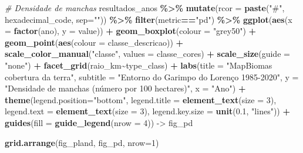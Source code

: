 \documentclass[
]{article}
\newenvironment{Shaded}{\begin{snugshade}}{\end{snugshade}}
\newcommand{\AttributeTok}[1]{\textcolor[rgb]{0.13,0.29,0.53}{#1}}
\newcommand{\CommentTok}[1]{\textcolor[rgb]{0.56,0.35,0.01}{\textit{#1}}}
\newcommand{\DecValTok}[1]{\textcolor[rgb]{0.00,0.00,0.81}{#1}}
\newcommand{\FloatTok}[1]{\textcolor[rgb]{0.00,0.00,0.81}{#1}}
\newcommand{\FunctionTok}[1]{\textcolor[rgb]{0.13,0.29,0.53}{\textbf{#1}}}
\newcommand{\NormalTok}[1]{#1}
\newcommand{\OtherTok}[1]{\textcolor[rgb]{0.56,0.35,0.01}{#1}}
\newcommand{\SpecialCharTok}[1]{\textcolor[rgb]{0.81,0.36,0.00}{\textbf{#1}}}
\newcommand{\StringTok}[1]{\textcolor[rgb]{0.31,0.60,0.02}{#1}}
\begin{document}
\begin{Shaded}
\begin{Highlighting}[]
\CommentTok{\# Densidade de manchas}
\NormalTok{resultados\_anos }\SpecialCharTok{\%\textgreater{}\%} 
  \FunctionTok{mutate}\NormalTok{(}\AttributeTok{rcor =} \FunctionTok{paste}\NormalTok{(}\StringTok{"\#"}\NormalTok{, hexadecimal\_code, }\AttributeTok{sep=}\StringTok{""}\NormalTok{)) }\SpecialCharTok{\%\textgreater{}\%} 
  \FunctionTok{filter}\NormalTok{(metric}\SpecialCharTok{==}\StringTok{"pd"}\NormalTok{) }\SpecialCharTok{\%\textgreater{}\%}
\FunctionTok{ggplot}\NormalTok{(}\FunctionTok{aes}\NormalTok{(}\AttributeTok{x =} \FunctionTok{factor}\NormalTok{(ano), }\AttributeTok{y =}\NormalTok{ value)) }\SpecialCharTok{+} 
\FunctionTok{geom\_boxplot}\NormalTok{(}\AttributeTok{colour =} \StringTok{"grey50"}\NormalTok{) }\SpecialCharTok{+} 
\FunctionTok{geom\_point}\NormalTok{(}\FunctionTok{aes}\NormalTok{(}\AttributeTok{colour =}\NormalTok{ classe\_descricao)) }\SpecialCharTok{+} 
\FunctionTok{scale\_color\_manual}\NormalTok{(}\StringTok{"classe"}\NormalTok{, }\AttributeTok{values =}\NormalTok{ classe\_cores) }\SpecialCharTok{+}
\FunctionTok{scale\_size}\NormalTok{(}\AttributeTok{guide =} \StringTok{"none"}\NormalTok{) }\SpecialCharTok{+} 
\FunctionTok{facet\_grid}\NormalTok{(raio\_km}\SpecialCharTok{\textasciitilde{}}\NormalTok{type\_class) }\SpecialCharTok{+}
\FunctionTok{labs}\NormalTok{(}\AttributeTok{title =} \StringTok{"MapBiomas cobertura da terra"}\NormalTok{, }
\AttributeTok{subtitle =} \StringTok{"Entorno do Garimpo do Lorenço 1985{-}2020"}\NormalTok{,}
\AttributeTok{y =} \StringTok{"Densidade de manchas (número por 100 hectares)"}\NormalTok{, }
\AttributeTok{x =} \StringTok{"Ano"}\NormalTok{) }\SpecialCharTok{+} 
\FunctionTok{theme}\NormalTok{(}\AttributeTok{legend.position=}\StringTok{"bottom"}\NormalTok{, }
      \AttributeTok{legend.title =} \FunctionTok{element\_text}\NormalTok{(}\AttributeTok{size =} \DecValTok{3}\NormalTok{), }
              \AttributeTok{legend.text  =} \FunctionTok{element\_text}\NormalTok{(}\AttributeTok{size =} \DecValTok{3}\NormalTok{),}
              \AttributeTok{legend.key.size =} \FunctionTok{unit}\NormalTok{(}\FloatTok{0.1}\NormalTok{, }\StringTok{"lines"}\NormalTok{)) }\SpecialCharTok{+} 
\FunctionTok{guides}\NormalTok{(}\AttributeTok{fill =} \FunctionTok{guide\_legend}\NormalTok{(}\AttributeTok{nrow =} \DecValTok{4}\NormalTok{)) }\OtherTok{{-}\textgreater{}}\NormalTok{ fig\_pd}

\FunctionTok{grid.arrange}\NormalTok{(fig\_pland, fig\_pd, }\AttributeTok{nrow=}\DecValTok{1}\NormalTok{)}
\end{Highlighting}
\end{Shaded}
\end{document}
